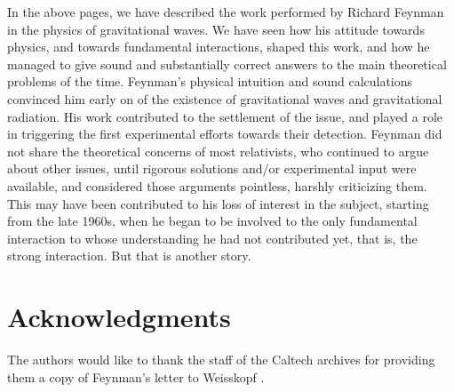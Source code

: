 \documentclass{ws-procs961x669}            %
\begin{document}
In the above pages, we have described the work performed by
Richard Feynman in the physics of gravitational waves. We have
seen how his attitude towards physics, and towards fundamental
interactions, shaped this work, and how he managed to give sound
and substantially correct answers to the main theoretical problems
of the time. Feynman's physical intuition and sound calculations
convinced him early on of the existence of gravitational waves and
gravitational radiation. His work contributed to the settlement of
the issue, and played a role in triggering the first experimental
efforts towards their detection. Feynman did not share the
theoretical concerns of most relativists, who continued to argue
about other issues, until rigorous solutions and/or experimental
input were available, and considered those arguments pointless,
harshly criticizing them. This may have been contributed to his
loss of interest in the subject, starting from the late 1960s,
when he began to be involved to the only fundamental interaction
to whose understanding he had not contributed yet, that is, the
strong interaction\cite{Mehra:1994dz}. But that is another story.

\section*{Acknowledgments}

The authors would like to thank the staff of the Caltech archives
for providing them a copy of Feynman's letter to Weisskopf
\cite{WeisskopfLetter}.

\end{document}
